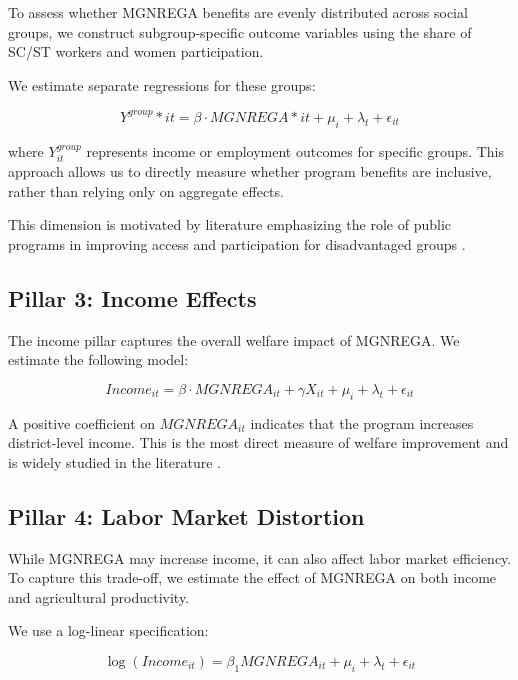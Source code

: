 \documentclass[12pt]{article}
\begin{document}
To assess whether MGNREGA benefits are evenly distributed across social groups, we construct subgroup-specific outcome variables using the share of SC/ST workers and women participation.

We estimate separate regressions for these groups:

\begin{equation}
Y^{group}*{it} = \beta \cdot MGNREGA*{it} + \mu_i + \lambda_t + \epsilon_{it}
\end{equation}

where $Y^{group}_{it}$ represents income or employment outcomes for specific groups. This approach allows us to directly measure whether program benefits are inclusive, rather than relying only on aggregate effects.

This dimension is motivated by literature emphasizing the role of public programs in improving access and participation for disadvantaged groups \citep{Duflo2012}.

\subsection{Pillar 3: Income Effects}

The income pillar captures the overall welfare impact of MGNREGA. We estimate the following model:

\begin{equation}
Income_{it} = \beta \cdot MGNREGA_{it} + \gamma X_{it} + \mu_i + \lambda_t + \epsilon_{it}
\end{equation}

A positive coefficient on $MGNREGA_{it}$ indicates that the program increases district-level income. This is the most direct measure of welfare improvement and is widely studied in the literature \citep{ImbertPapp2015}.



\subsection{Pillar 4: Labor Market Distortion}

While MGNREGA may increase income, it can also affect labor market efficiency. To capture this trade-off, we estimate the effect of MGNREGA on both income and agricultural productivity.

We use a log-linear specification:

\begin{equation}
\log(Income_{it}) = \beta_1 MGNREGA_{it} + \mu_i + \lambda_t + \epsilon_{it}
\end{equation}
\end{document}
